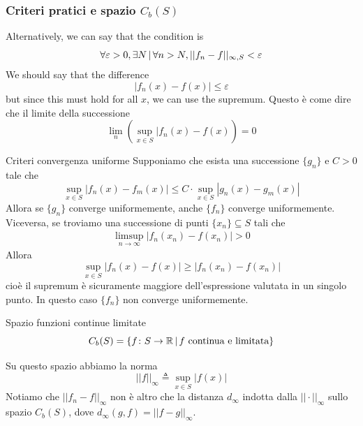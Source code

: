 \documentclass[a4paper]{article}
\begin{document}
\subsubsection{Criteri pratici e spazio \(C_b(S)\)}

\begin{radioactive}
Alternatively, we can say that the condition is
\[
    \forall \varepsilon > 0, \exists N \,|\, \forall n>N, ||f_n-f||_{\infty, S} < \varepsilon
\]
We should say that the difference
\[
    |f_n(x) - f(x)| \leq \varepsilon
\]
but since this must hold for all \(x\), we can use the supremum.
Questo è come dire che il limite della successione
\[
    \lim_n \left(\sup_{x\in S} |f_n(x) - f(x)\right) = 0
\]
\end{radioactive}

\begin{radioactive}
\begin{snippetproposition}{Criteri convergenza uniforme}
    Supponiamo che esista una successione \(\{g_n\}\) e \(C>0\) tale che
    \[
        \sup_{x\in S} |f_n(x) - f_m(x)| \leq C \cdot \sup_{x\in S}|g_n(x) - g_m(x)|
    \]
    Allora se \(\{g_n\}\) converge uniformemente, anche \(\{f_n\}\) converge uniformemente.
    Viceversa, se troviamo una successione di punti \(\{x_n\} \subseteq S\)
    tali che
    \begin{align*}
        \limsup_{n\to\infty}|f_n(x_n)-f(x_n)|>0
    \end{align*}
    Allora \[
        \sup_{x\in S} |f_n(x) - f(x)| \geq |f_n(x_n) - f(x_n)|
    \]
    cioè il supremum è sicuramente maggiore dell'espressione valutata in un singolo punto.
    In questo caso \(\{f_n\}\) non converge uniformemente.
\end{snippetproposition}
\end{radioactive}

\begin{radioactive}
\begin{snippetdefinition}{Spazio funzioni continue limitate}
    \[
        C_b(S) = \{
            f \colon S \to \mathbb{R} \,|\,
            f \text{ continua e limitata}
        \}
    \]
\end{snippetdefinition}
\end{radioactive}

\begin{radioactive}
Su questo spazio abbiamo la norma
\[
    ||f||_{\infty} \triangleq \sup_{x \in S} |f(x)|
\]
Notiamo che \(||f_n-f||_\infty\) non è altro che la distanza \(d_\infty\)
indotta dalla \(||\cdot||_\infty\) sullo spazio \(C_b(S)\),
dove \(d_\infty(g, f) = ||f-g||_\infty\).
\end{radioactive}
\end{document}
